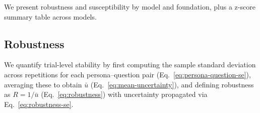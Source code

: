 \documentclass{article}
\begin{document}
We present robustness and susceptibility by model and foundation, plus a z-score summary table across models.



\subsection{Robustness}
We quantify trial-level stability by first computing the sample standard deviation across repetitions for each persona–question pair (Eq.~\ref{eq:persona-question-se}), averaging these to obtain \(\bar{u}\) (Eq.~\ref{eq:mean-uncertainty}), and defining robustness as \(R = 1/\bar{u}\) (Eq.~\ref{eq:robustness}) with uncertainty propagated via Eq.~\ref{eq:robustness-se}.
\end{document}
